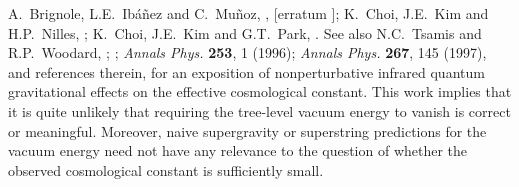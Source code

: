 \begin{thebibliography}{99}
 A.~Brignole, L.E.~Ib\'a\~nez and C.~Mu\~noz,
, [erratum ]; 
K.~Choi, J.E.~Kim and H.P.~Nilles, ;
K.~Choi, J.E.~Kim and G.T.~Park, . See also
N.C.~Tsamis and R.P.~Woodard, ;
;  {\it Annals Phys.} {\bf 253}, 1 (1996);
{\it Annals Phys.} {\bf 267}, 145 (1997),
and references therein, for an exposition of nonperturbative
infrared quantum gravitational effects on the effective cosmological
constant. This work implies that it is quite unlikely that requiring the
tree-level vacuum energy to vanish is correct or meaningful. Moreover,
naive
supergravity or superstring predictions for the vacuum energy
need not have any relevance to the question of whether the observed
cosmological constant is sufficiently small.

\end{thebibliography}


